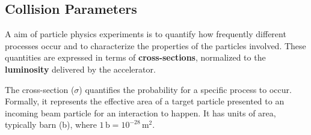 \subsection{Collision Parameters}\label{sec:cross_sec_lumi}

A aim of particle physics experiments is to quantify how frequently different processes occur and to characterize the properties of the particles involved. These quantities are expressed in terms of \textbf{cross-sections}, normalized to the \textbf{luminosity} delivered by the accelerator.


The cross-section ($\sigma$) quantifies the probability for a specific process to occur. Formally, it represents the effective area of a target particle presented to an incoming beam particle for an interaction to happen. It has units of area, typically barn (b), where $1\,\text{b} = 10^{-28}\,\text{m}^2$.

